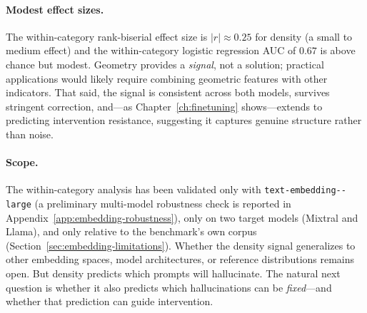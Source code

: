 \paragraph{Modest effect sizes.} The within-category rank-biserial effect size is $|r| \approx 0.25$ for density (a small to medium effect) and the within-category logistic regression AUC of $0.67$ is above chance but modest. Geometry provides a \emph{signal}, not a solution; practical applications would likely require combining geometric features with other indicators. That said, the signal is consistent across both models, survives stringent correction, and---as Chapter~\ref{ch:finetuning} shows---extends to predicting intervention resistance, suggesting it captures genuine structure rather than noise.

\paragraph{Scope.} The within-category analysis has been validated only with {\texttt{text-\allowbreak embedding--\allowbreak large}} (a preliminary multi-model robustness check is reported in Appendix~\ref{app:embedding-robustness}), only on two target models (Mixtral and Llama), and only relative to the benchmark's own corpus (Section~\ref{sec:embedding-limitations}). Whether the density signal generalizes to other embedding spaces, model architectures, or reference distributions remains open. But density predicts which prompts will hallucinate. The natural next question is whether it also predicts which hallucinations can be \emph{fixed}---and whether that prediction can guide intervention.
